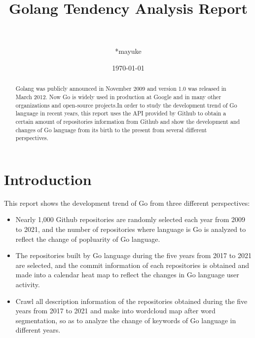 \documentclass[11pt,onside,a4paper,fleqn]{report}
\title{\bf Golang Tendency Analysis Report}  %
\author{ \\ \\*mayuke\\}
\date{\today}                           %
\begin{document}
\maketitle                              %
\begin{abstract}

Golang was publicly announced in November 2009 and version 1.0 was released in March 2012. Now Go is widely used in production at Google and in many other organizations and open-source projects.In order to study the development trend of Go language in recent years, this report uses the API provided by Github to obtain a certain amount of repositories information from Github and show the development and changes of Go language from its birth to the present from several different perspectives.

\end{abstract}
\setcounter{page}{1}                    %
\chapter{Introduction}
This report shows the development trend of Go from three different perspectives:
\begin{itemize}
\item Nearly 1,000 Github repositories are randomly selected each year from 2009 to 2021, and the number of repositories where language is Go is analyzed to reflect the change of popluarity of Go language.

\item The repositories built by Go language during the five years from 2017 to 2021 are selected, and the commit information of each repositories is obtained and made into a calendar 
heat map to reflect the changes in Go language user activity.

\item Crawl all description information of the repositories obtained during the five years from 2017 to 2021 and make into wordcloud map after word segmentation, so as to analyze
 the change of keywords of Go language in different years.
\end{itemize}

 
\end{document}
